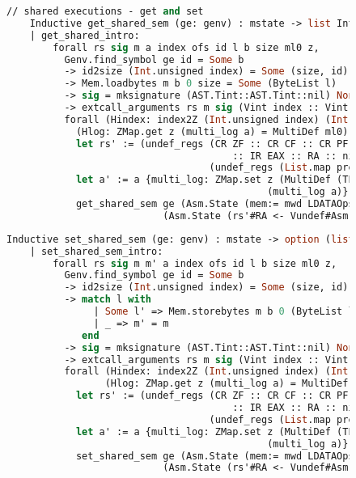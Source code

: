 \begin{figure}
\begin{lstlisting}[language=Caml]
    // shared executions - get and set    
    Inductive get_shared_sem (ge: genv) : mstate -> list Integers.Byte.int -> mstate -> Prop:=
    | get_shared_intro: 
        forall rs sig m a index ofs id l b size ml0 z,
          Genv.find_symbol ge id = Some b
          -> id2size (Int.unsigned index) = Some (size, id)
          -> Mem.loadbytes m b 0 size = Some (ByteList l)
          -> sig = mksignature (AST.Tint::AST.Tint::nil) None cc_default
          -> extcall_arguments rs m sig (Vint index :: Vint ofs ::nil) ->
          forall (Hindex: index2Z (Int.unsigned index) (Int.unsigned ofs) = Some z)
            (Hlog: ZMap.get z (multi_log a) = MultiDef ml0),
            let rs' := (undef_regs (CR ZF :: CR CF :: CR PF :: CR SF :: CR OF
                                       :: IR EAX :: RA :: nil)
                                   (undef_regs (List.map preg_of destroyed_at_call) rs)) in
            let a' := a {multi_log: ZMap.set z (MultiDef (TEVENT (CPU_ID a) (TSHARED (OMEME l)) :: ml0))
                                             (multi_log a)} in
            get_shared_sem ge (Asm.State (mem:= mwd LDATAOps) rs (m, a)) l 
                           (Asm.State (rs'#RA <- Vundef#Asm.PC <- (rs RA)) (m, a')).
\end{lstlisting}
\end{figure}

\begin{figure}
\begin{lstlisting}[language=Caml]
    Inductive set_shared_sem (ge: genv) : mstate -> option (list Integers.Byte.int) -> mstate -> Prop:=
    | set_shared_sem_intro: 
        forall rs sig m m' a index ofs id l b size ml0 z,
          Genv.find_symbol ge id = Some b
          -> id2size (Int.unsigned index) = Some (size, id)
          -> match l with
               | Some l' => Mem.storebytes m b 0 (ByteList l') = Some m'
               | _ => m' = m
             end
          -> sig = mksignature (AST.Tint::AST.Tint::nil) None cc_default
          -> extcall_arguments rs m sig (Vint index :: Vint ofs :: nil) ->
          forall (Hindex: index2Z (Int.unsigned index) (Int.unsigned ofs) = Some z)
                 (Hlog: ZMap.get z (multi_log a) = MultiDef ml0),
            let rs' := (undef_regs (CR ZF :: CR CF :: CR PF :: CR SF :: CR OF
                                       :: IR EAX :: RA :: nil)
                                   (undef_regs (List.map preg_of destroyed_at_call) rs)) in
            let a' := a {multi_log: ZMap.set z (MultiDef (TEVENT (CPU_ID a) (TSHARED OPULL) :: ml0))
                                             (multi_log a)} in
            set_shared_sem ge (Asm.State (mem:= mwd LDATAOps) rs (m, a)) l 
                           (Asm.State (rs'#RA <- Vundef#Asm.PC <- (rs RA)) (m', a')).
\end{lstlisting}
\end{figure}

